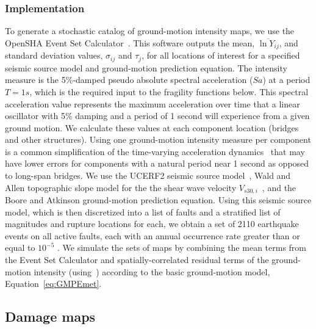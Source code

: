 \subsubsection{Implementation}
To generate a stochastic catalog of ground-motion intensity maps, we use the OpenSHA Event Set Calculator~\cite{field_opensha:_2003}. This software outputs the mean, $\overline{\ln Y_{ij}}$, and standard deviation values, $\sigma_{ij}$ and $\tau_j$, for all locations of interest for a specified seismic source model and ground-motion prediction equation. The intensity measure is the 5\%-damped pseudo absolute  spectral acceleration ($Sa$) at a period $T=1s$, which is the required input to the fragility functions below. This spectral acceleration value represents the maximum acceleration over time  that a linear oscillator with 5\% damping and a period of 1 second will experience from a given ground motion. We calculate these values at each component location (bridges and other structures). Using one ground-motion intensity measure per component is a common simplification of the time-varying acceleration dynamics~\cite[e.g.,][]{shinozuka_effect_2003,jayaram_efficient_2010} that may have lower errors for components with a natural period near 1 second as opposed to long-span bridges.
We use the UCERF2 seismic source model~\cite{field_uniform_2009}, Wald and Allen topographic slope model for the the shear wave velocity $V_{s30,i}$~\cite{wald_topographic_2007}, and the Boore and Atkinson \cite{boore_ground-motion_2008} ground-motion prediction equation.   Using this seismic source model, which is then discretized into a list of faults and a stratified list of magnitudes and rupture locations for each, we obtain a set of 2110 earthquake events on all active faults, each with an annual occurrence rate greater than or equal to $10^{-5}$ . We simulate the sets of maps by combining the mean terms from the Event Set Calculator and spatially-correlated residual terms of the ground-motion intensity  (using~\cite{jayaram_correlation_2009}) according to the basic ground-motion model, Equation~\ref{eq:GMPEmet}. 


\subsection{Damage maps}

